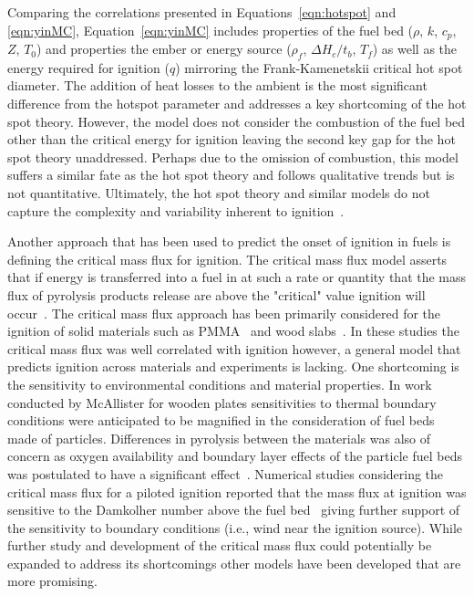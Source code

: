     Comparing the correlations presented in Equations~\ref{eqn:hotspot} and \ref{eqn:yinMC}, Equation~\ref{eqn:yinMC} includes properties of the fuel bed ($\rho$, $k$, $c_p$, $Z$, $T_0$) and properties the ember or energy source ($\rho_f$, $\Delta H_c/t_b$, $T_f$) as well as the energy required for ignition ($q$) mirroring the Frank-Kamenetskii critical hot spot diameter. The addition of heat losses to the ambient is the most significant difference from the hotspot parameter and addresses a key shortcoming of the hot spot theory. However, the model does not consider the combustion of the fuel bed other than the critical energy for ignition leaving the second key gap for the hot spot theory unaddressed. Perhaps due to the omission of combustion, this model suffers a similar fate as the hot spot theory and follows qualitative trends but is not quantitative. Ultimately, the hot spot theory and similar models do not capture the complexity and variability inherent to ignition~\cite{Manzello2020}. 
    
    Another approach that has been used to predict the onset of ignition in fuels is defining the critical mass flux for ignition. The critical mass flux model asserts that if energy is transferred into a fuel in at such a rate or quantity that the mass flux of pyrolysis products release are above the "critical" value ignition will occur~\cite{Nelson1995}. The critical mass flux approach has been primarily considered for the ignition of solid materials such as PMMA~\cite{Rich2007} and wood slabs~\cite{Yashwanth2015, McAllister2013}. In these studies the critical mass flux was well correlated with ignition however, a general model that predicts ignition across materials and experiments is lacking. One shortcoming is the sensitivity to environmental conditions and material properties. In work conducted by McAllister for wooden plates sensitivities to thermal boundary conditions were anticipated to be magnified in the consideration of fuel beds made of particles. Differences in pyrolysis between the materials was also of concern as oxygen availability and boundary layer effects of the particle fuel beds was postulated to have a significant effect~\cite{McAllister2013}.  Numerical studies considering the critical mass flux for a piloted ignition reported that the mass flux at ignition was sensitive to the Damkolher number above the fuel bed~\cite{Dai2013} giving further support of the sensitivity to boundary conditions (i.e., wind near the ignition source). While further study and development of the critical mass flux could potentially be expanded to address its shortcomings other models have been developed that are more promising.
    

